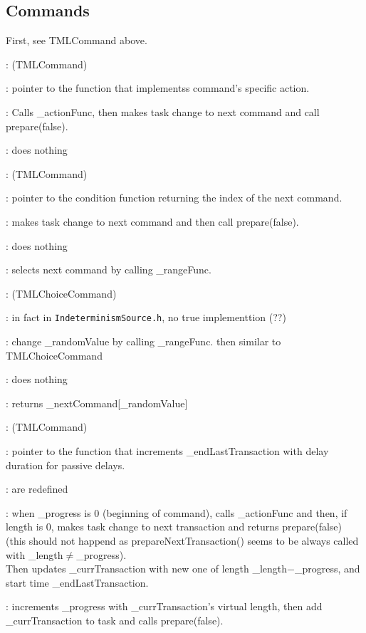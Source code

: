 \documentclass[a4paper,11pt]{article}
\newcommand{\bfont}{\fontseries{b}\selectfont}
\newcommand{\cod}[1]{{\ttfamily #1}}
\newcommand{\class}[2]{\par\vspace{1mm}\hspace{-5mm}\large\colorbox{file}{\textbullet\bfont\cod{#1}:} (\cod{#2})\par}
\newcommand{\method}[1]{\par\vspace{1mm}\hspace{-2mm}\colorbox{method}{\textopenbullet\bfont\cod{#1}:}}
\newcommand{\variable}[1]{\par\vspace{1mm}\hspace{-2mm}\colorbox{variable}{\textopenbullet\bfont\cod{#1}:}}
\begin{document}
\subsection*{Commands}
First, see \cod{TMLCommand} above.
\class{TMLActionCommand}{TMLCommand}
\variable{\_actionFunc} pointer to the function that implementss command's specific action.
\method{prepareNextTransaction()} Calls \cod{\_actionFunc}, then makes task change to next command and call \cod{prepare(false)}.
\method{execute()} does nothing

\class{TMLChoiceCommand}{TMLCommand}
\variable{\_rangeFunc} pointer to the condition function returning the index of the next command.
\method{prepareNextTransaction()} makes task change to next command and then call \cod{pre\-pa\-re(false)}.
\method{execute()} does nothing
\method{getNextCommands()} selects next command by calling \cod{\_rangeFunc}.

\class{TMLRandomChoiceCommand}{TMLChoiceCommand}
\variable{\_randomValue} in fact in {\tt IndeterminismSource.h}, no true implementtion (??)
\method{prepareNextTransaction()} change \cod{\_randomValue} by calling \cod{\_rangeFunc}. then similar to \cod{TMLChoiceCommand}
\method{execute()} does nothing
\method{getNextCommands()} returns \cod{\_nextCommand[\_randomValue]}

\class{TMLDelayCommand}{TMLCommand}
\variable{\_actionFunc} pointer to the function that increments \cod{\_endLastTransaction} with delay duration for passive delays.
\method{getActiveDelay(), isDelayTransaction()} are redefined
\method{prepareNextTransaction()} when \cod{\_progress} is 0 (beginning of command), calls \cod{\_ac\-tionFunc} and then, if \cod{length} is 0, makes task change to next transaction and returns \cod{prepare(false)} (this should not happend as \cod{prepareNextTransaction()} seems to be always called with \cod{\_length}$\neq$\cod{\_progress}).\\ Then updates \cod{\_currTransaction} with new one of length \cod{\_length}$-$\cod{\_progress}, and start time \cod{\_endLastTransaction}.
\method{execute()} increments \cod{\_progress} with \cod{\_currTransaction}'s virtual length, then add \cod{\_curr\-Transaction} to task and calls \cod{prepare(false)}.
\end{document}
